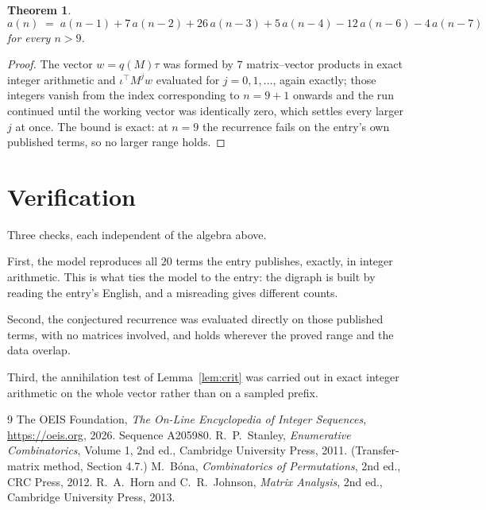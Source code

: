 \documentclass[11pt,a4paper]{article}
\theoremstyle{plain}
\newtheorem{theorem}{Theorem}
\theoremstyle{definition}
\begin{document}
\begin{theorem}
\[
a(n)\;=\;a(n-1) + 7\,a(n-2) + 26\,a(n-3) + 5\,a(n-4) - 12\,a(n-6) - 4\,a(n-7)
\]
for every $n>9$.
\end{theorem}

\begin{proof}
The vector $w=q(M)\tau$ was formed by $7$ matrix--vector products in exact integer
arithmetic and $\iota^{\!\top}M^{j}w$ evaluated for $j=0,1,\dots$, again exactly; those
integers vanish from the index corresponding to $n=9+1$ onwards and the run continued
until the working vector was identically zero, which settles every larger $j$ at once. The bound is exact: at $n=9$ the recurrence fails on the entry's own published terms, so no larger range holds.
\end{proof}

\section{Verification}

Three checks, each independent of the algebra above.

First, the model reproduces all $20$ terms the entry publishes, exactly, in integer
arithmetic. This is what ties the model to the entry: the digraph is built by reading the
entry's English, and a misreading gives different counts.

Second, the conjectured recurrence was evaluated directly on those published terms, with no
matrices involved, and holds wherever the proved range and the data overlap.

Third, the annihilation test of Lemma~\ref{lem:crit} was carried out in exact integer
arithmetic on the whole vector rather than on a sampled prefix.

\begin{thebibliography}{9}
 The OEIS Foundation, \emph{The On-Line Encyclopedia of Integer
Sequences}, \url{https://oeis.org}, 2026. Sequence A205980.
 R.~P.~Stanley, \emph{Enumerative Combinatorics}, Volume 1, 2nd ed.,
Cambridge University Press, 2011. (Transfer-matrix method, Section 4.7.)
 M.~B\'ona, \emph{Combinatorics of Permutations}, 2nd ed., CRC
Press, 2012.
 R.~A.~Horn and C.~R.~Johnson, \emph{Matrix Analysis}, 2nd ed., Cambridge
University Press, 2013.
\end{thebibliography}
\end{document}

